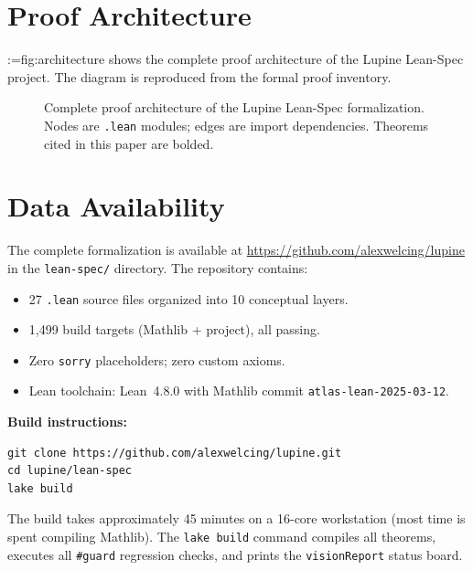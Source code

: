 \documentclass[11pt,a4paper]{article}
\makeatletter
\newcommand{\cref}[1]{\begingroup\def\crefsep{}\@for\crefitem:=#1\do{\crefsep\ref{\crefitem}\def\crefsep{, }}\endgroup}
\newcommand{\Cref}[1]{\cref{#1}}
\theoremstyle{definition}
\theoremstyle{plain}
\makeatother
\begin{document}
\section{Proof Architecture}
\label{sec:architecture}

\Cref{fig:architecture} shows the complete proof architecture of the Lupine Lean-Spec project. The diagram is reproduced from the formal proof inventory.

\begin{figure}[htbp]
\centering
{}
\caption{Complete proof architecture of the Lupine Lean-Spec formalization. Nodes are \texttt{.lean} modules; edges are import dependencies. Theorems cited in this paper are bolded.}
\label{fig:architecture}
\end{figure}

\section{Data Availability}
\label{sec:data}

The complete formalization is available at \url{https://github.com/alexwelcing/lupine} in the \texttt{lean-spec/} directory. The repository contains:
\begin{itemize}
\item 27 \texttt{.lean} source files organized into 10 conceptual layers.
\item 1,499 build targets (Mathlib + project), all passing.
\item Zero \texttt{sorry} placeholders; zero custom axioms.
\item Lean toolchain: Lean~4.8.0 with Mathlib commit \texttt{atlas-lean-2025-03-12}.
\end{itemize}

\textbf{Build instructions:}
\begin{verbatim}
git clone https://github.com/alexwelcing/lupine.git
cd lupine/lean-spec
lake build
\end{verbatim}

The build takes approximately 45 minutes on a 16-core workstation (most time is spent compiling Mathlib). The \texttt{lake build} command compiles all theorems, executes all \texttt{\#guard} regression checks, and prints the \texttt{visionReport} status board.
\end{document}
